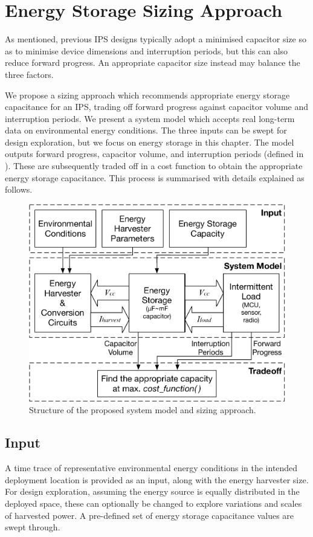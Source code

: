 \section{Energy Storage Sizing Approach} \label{sec:c4_approach}

As mentioned, previous IPS designs typically adopt a minimised capacitor size so as to minimise device dimensions and interruption periods, but this can also reduce forward progress.
An appropriate capacitor size instead may balance the three factors. 

We propose a sizing approach which recommends appropriate energy storage capacitance for an IPS, trading off forward progress against capacitor volume and interruption periods. 
We present a system model which accepts real long-term data on environmental energy conditions. 
The three inputs can be swept for design exploration, but we focus on energy storage in this chapter. 
The model outputs forward progress, capacitor volume, and interruption periods (defined in ). 
These are subsequently traded off in a cost function to obtain the appropriate energy storage capacitance. 
This process is summarised  with details explained as follows. 

\begin{figure}
    \centering
    \includegraphics[width=\columnwidth]{ch4_sizingapproach/figures/mdlfrw5}
    \caption{Structure of the proposed system model and sizing approach.}
    \label{fig:sizingapproach}
\end{figure}
    
\subsection{Input}
A time trace of representative environmental energy conditions in the intended deployment location is provided as an input, along with the energy harvester size. 
For design exploration, assuming the energy source is equally distributed in the deployed space, these can optionally be changed to explore variations and scales of harvested power. 
A pre-defined set of energy storage capacitance values are swept through. 

